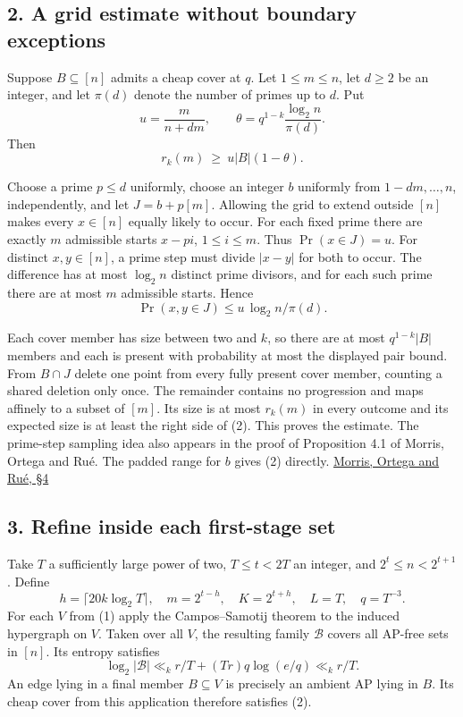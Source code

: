 \documentclass[10pt]{article}
\begin{document}
\subsection{2. A grid estimate without boundary exceptions}\label{a-grid-estimate-without-boundary-exceptions}

Suppose \(B\subseteq[n]\) admits a cheap cover at \(q\). Let \(1\le m\le n\), let \(d\ge2\) be an integer, and let \(\pi(d)\) denote the number of primes up to \(d\). Put \[
u=\frac{m}{n+dm},\qquad \theta=q^{1-k}\frac{\log_2 n}{\pi(d)}.
\] Then \[
r_k(m)\ \ge\ u|B|(1-\theta). \tag{2}
\]

Choose a prime \(p\le d\) uniformly, choose an integer \(b\) uniformly from \(1-dm,\ldots,n\), independently, and let \(J=b+p[m]\). Allowing the grid to extend outside \([n]\) makes every \(x\in[n]\) equally likely to occur. For each fixed prime there are exactly \(m\) admissible starts \(x-pi\), \(1\le i\le m\). Thus \(\Pr(x\in J)=u\). For distinct \(x,y\in[n]\), a prime step must divide \(|x-y|\) for both to occur. The difference has at most \(\log_2 n\) distinct prime divisors, and for each such prime there are at most \(m\) admissible starts. Hence \[
\Pr(x,y\in J)\le u\,\log_2 n/\pi(d).
\]

Each cover member has size between two and \(k\), so there are at most \(q^{1-k}|B|\) members and each is present with probability at most the displayed pair bound. From \(B\cap J\) delete one point from every fully present cover member, counting a shared deletion only once. The remainder contains no progression and maps affinely to a subset of \([m]\). Its size is at most \(r_k(m)\) in every outcome and its expected size is at least the right side of (2). This proves the estimate. The prime-step sampling idea also appears in the proof of Proposition 4.1 of Morris, Ortega and Rué. The padded range for \(b\) gives (2) directly. \href{https://arxiv.org/abs/2607.17746}{Morris, Ortega and Rué, §4}

\subsection{3. Refine inside each first-stage set}\label{refine-inside-each-first-stage-set}

Take \(T\) a sufficiently large power of two, \(T\le t<2T\) an integer, and \(2^t\le n<2^{t+1}\). Define \[
h=\lceil20k\log_2 T\rceil,\quad m=2^{t-h},\quad K=2^{t+h},
\quad L=T,\quad q=T^{-3}.
\] For each \(V\) from (1) apply the Campos--Samotij theorem to the induced hypergraph on \(V\). Taken over all \(V\), the resulting family \(\mathcal B\) covers all AP-free sets in \([n]\). Its entropy satisfies \[
\log_2|\mathcal B|\ll_k r/T + (Tr)q\log(e/q)\ll_k r/T. \tag{3}
\] An edge lying in a final member \(B\subseteq V\) is precisely an ambient AP lying in \(B\). Its cheap cover from this application therefore satisfies (2).
\end{document}
